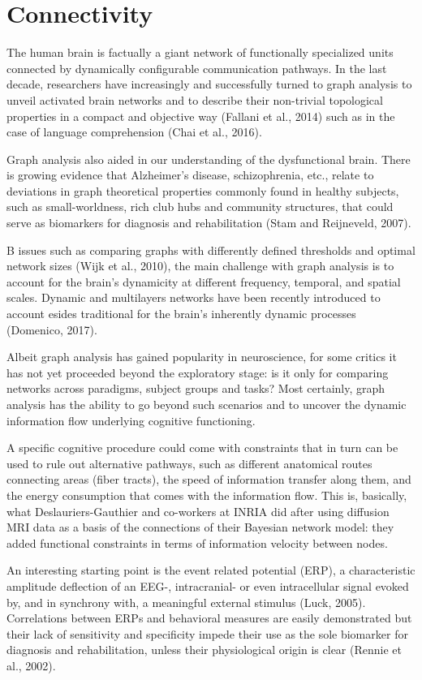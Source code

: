 \section{Connectivity}


The human brain is factually a giant network of functionally specialized units connected by dynamically configurable communication pathways. In the last decade, researchers have increasingly and successfully turned to graph analysis to unveil activated brain networks and to describe their non-trivial topological properties in a compact and objective way (Fallani et al., 2014) such as in the case of language comprehension (Chai et al., 2016). 

Graph analysis also aided in our understanding of the dysfunctional brain. There is growing evidence that Alzheimer's disease, schizophrenia, etc., relate to deviations in graph theoretical properties commonly found in healthy subjects, such as small-worldness, rich club hubs and community structures, that could serve as biomarkers for diagnosis and rehabilitation (Stam and Reijneveld, 2007).

B issues such as comparing graphs with differently defined thresholds and optimal network sizes (Wijk et al., 2010), the main challenge with graph analysis is to account for the brain's dynamicity at different frequency, temporal, and spatial scales. Dynamic and multilayers networks have been recently introduced to account esides traditional for the brain's inherently dynamic processes (Domenico, 2017).

Albeit graph analysis has gained popularity in neuroscience, for some critics it has not yet proceeded beyond the exploratory stage: is it only for comparing networks across paradigms, subject groups and tasks? Most certainly, graph analysis has the ability to go beyond such scenarios and to uncover the dynamic information flow underlying cognitive functioning. 

A specific cognitive procedure could come with constraints that in turn can be used to rule out alternative pathways, such as different anatomical routes connecting areas (fiber tracts), the speed of information transfer along them, and the energy consumption that comes with the information flow. This is, basically, what Deslauriers-Gauthier and co-workers at INRIA did after using diffusion MRI data as a basis of the connections of their Bayesian network model: they added functional constraints in terms of information velocity between nodes.

An interesting starting point is the event related potential (ERP), a characteristic amplitude deflection of an EEG-, intracranial- or even intracellular signal evoked by, and in synchrony with, a meaningful external stimulus (Luck, 2005). Correlations between ERPs and behavioral measures are easily demonstrated but their lack of sensitivity and specificity impede their use as the sole biomarker for diagnosis and rehabilitation, unless their physiological origin is clear (Rennie et al., 2002).

